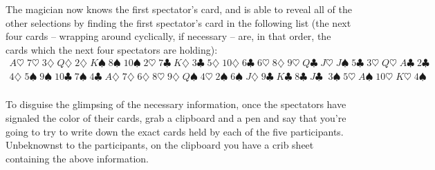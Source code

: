 \documentclass{article}
\theoremstyle{plain}
\theoremstyle{definition}
\theoremstyle{remark}
\begin{document}
The magician now knows the first spectator's card, and is able to reveal all of the other selections by finding the first spectator's card in the following list (the next four cards -- wrapping around cyclically, if necessary -- are, in that order, the cards which the next four spectators are holding):
\[
\begin{aligned}
A\heartsuit \; 7\heartsuit \; 3\diamondsuit \; Q\diamondsuit \; 2\diamondsuit \; K\spadesuit \; 8\spadesuit \; 10\spadesuit \; 2\heartsuit \; 7\clubsuit \; K\diamondsuit \; 3\clubsuit \; 5\diamondsuit \; 10\diamondsuit \; 6\clubsuit \; 6\heartsuit \; 8\diamondsuit \; 9\heartsuit \; Q\clubsuit \; J\heartsuit \; J\spadesuit \; 5\clubsuit \; 3\heartsuit \; Q\heartsuit \; A\clubsuit \; 2\clubsuit \\
4\diamondsuit \; 5\spadesuit \; 9\spadesuit \; 10\clubsuit \; 7\spadesuit \; 4\clubsuit \; A\diamondsuit \; 7\diamondsuit \; 6\diamondsuit \; 8\heartsuit \; 9\diamondsuit \; Q\spadesuit \; 4\heartsuit\; 2\spadesuit \; 6\spadesuit \; J\diamondsuit \; 9\clubsuit \; K\clubsuit \; 8\clubsuit \; J\clubsuit \;  \; 3\spadesuit \; 5\heartsuit \; A\spadesuit \; 10\heartsuit \; K\heartsuit \; 4\spadesuit \\ 
\end{aligned}
\]

To disguise the glimpsing of the necessary information, once the spectators have signaled the color of their cards, grab a clipboard and a pen and say that you're going to try to write down the exact cards held by each of the five participants. Unbeknownst to the participants, on the clipboard you have a crib sheet containing the above information. 
\end{document}
